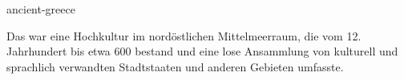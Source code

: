\documentclass{stex}
\begin{document}
\begin{smodule}[sig=en]{ancient-greece}
\begin{sparagraph}[style=symdoc]
Das  war eine Hochkultur im
nordöstlichen Mittelmeerraum, die vom 12. Jahrhundert \vChr{} bis etwa 600
\nChr{} bestand und eine lose Ansammlung von kulturell und sprachlich
verwandten Stadtstaaten und anderen Gebieten umfasste.
\end{sparagraph}
\end{smodule}
\end{document}
